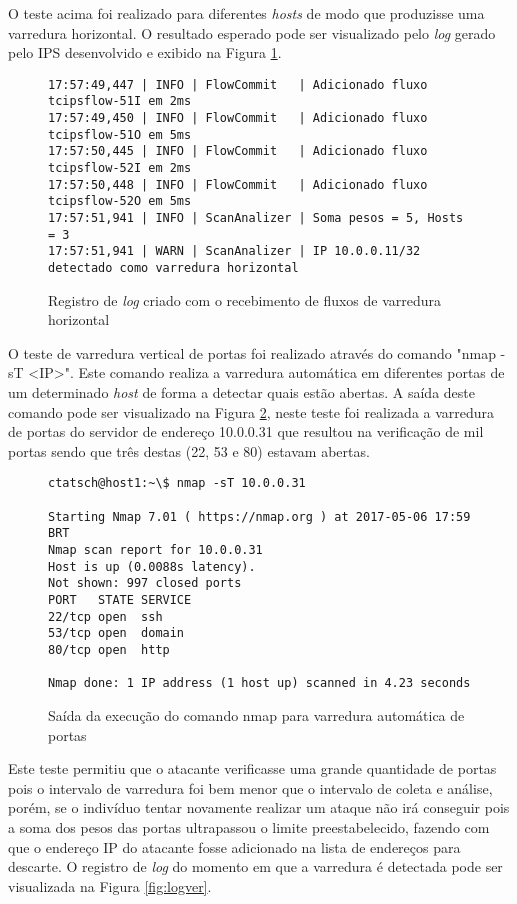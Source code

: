O teste acima foi realizado para diferentes \textit{hosts} de modo que produzisse uma varredura horizontal. O resultado esperado pode ser visualizado pelo \textit{log} gerado pelo IPS desenvolvido e exibido na Figura \ref{fig:loghor}.
\FloatBarrier
\begin{figure}[H]
\centering
\caption{Registro de \textit{log} criado com o recebimento de fluxos de varredura horizontal}
\begin{lstlisting}[belowskip=-0.05\baselineskip]
17:57:49,447 | INFO | FlowCommit   | Adicionado fluxo tcipsflow-51I em 2ms
17:57:49,450 | INFO | FlowCommit   | Adicionado fluxo tcipsflow-51O em 5ms
17:57:50,445 | INFO | FlowCommit   | Adicionado fluxo tcipsflow-52I em 2ms
17:57:50,448 | INFO | FlowCommit   | Adicionado fluxo tcipsflow-52O em 5ms
17:57:51,941 | INFO | ScanAnalizer | Soma pesos = 5, Hosts = 3
17:57:51,941 | WARN | ScanAnalizer | IP 10.0.0.11/32 detectado como varredura horizontal
\end{lstlisting}
\label{fig:loghor}
\end{figure}



O teste de varredura vertical de portas foi realizado através do comando "nmap -sT <IP>". Este comando realiza a varredura automática em diferentes portas de um determinado \textit{host} de forma a detectar quais estão abertas. A saída deste comando pode ser visualizado na Figura \ref{fig:outnmapst}, neste teste foi realizada a varredura de portas do servidor de endereço 10.0.0.31 que resultou na verificação de mil portas sendo que três destas (22, 53 e 80) estavam abertas.
\FloatBarrier
\begin{figure}[H]
\centering
\caption{Saída da execução do comando nmap para varredura automática de portas}
\begin{lstlisting}[belowskip=-0.05\baselineskip]
ctatsch@host1:~\$ nmap -sT 10.0.0.31

Starting Nmap 7.01 ( https://nmap.org ) at 2017-05-06 17:59 BRT
Nmap scan report for 10.0.0.31
Host is up (0.0088s latency).
Not shown: 997 closed ports
PORT   STATE SERVICE
22/tcp open  ssh
53/tcp open  domain
80/tcp open  http

Nmap done: 1 IP address (1 host up) scanned in 4.23 seconds
\end{lstlisting}
\label{fig:outnmapst}
\end{figure}

Este teste permitiu que o atacante verificasse uma grande quantidade de portas pois o intervalo de varredura foi bem menor que o intervalo de coleta e análise, porém, se o indivíduo tentar novamente realizar um ataque não irá conseguir pois a soma dos pesos das portas ultrapassou o limite preestabelecido, fazendo com que o endereço IP do atacante fosse adicionado na lista de endereços para descarte. O registro de \textit{log} do momento em que a varredura é detectada pode ser visualizada na Figura \ref{fig:logver}.

